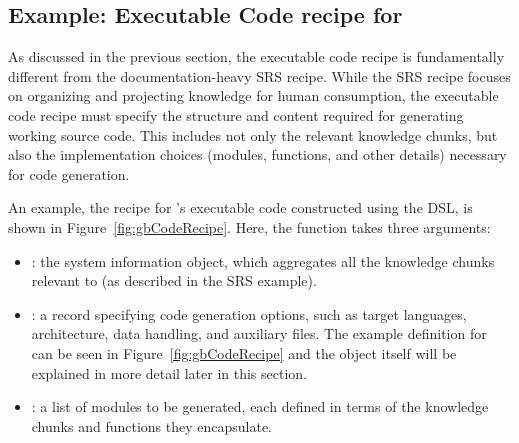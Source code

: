 \subsection{Example: Executable Code recipe for \gb{}}
\label{sec:gbCodeRecipe}

%

As discussed in the previous section, the executable code recipe is 
fundamentally different from the documentation-heavy SRS recipe. While the SRS 
recipe focuses on organizing and projecting knowledge for human consumption, 
the executable code recipe must specify the structure and content required for 
generating working source code. This includes not only the relevant knowledge 
chunks, but also the implementation choices (modules, functions, and other 
details) necessary for code generation. 

An example, the recipe for \gb{}'s executable code constructed using the 
 DSL, is shown in Figure~\ref{fig:gbCodeRecipe}. 
Here, the  function takes three arguments:
\begin{itemize}
\item {}: the system information object, which aggregates all the 
knowledge chunks relevant to \gb{} (as described in the SRS example).
\item {}: a record specifying code generation options, such as 
target languages, architecture, data handling, and auxiliary files. The example 
 definition for \gb{} can be seen in 
Figure~\ref{fig:gbCodeRecipe} and the object itself will be explained in more 
detail later in this section.
\item {}: a list of modules to be generated, each defined in terms 
of the knowledge chunks and functions they encapsulate.
\end{itemize}


